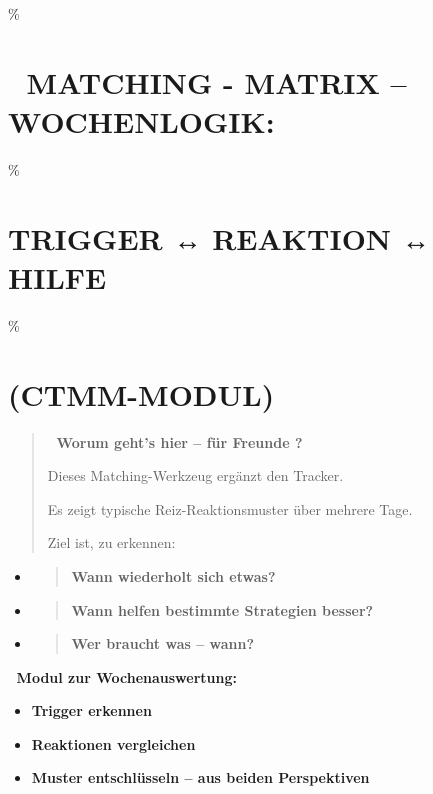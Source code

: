 \hypertarget{matching---matrix-wochenlogik}{\%
\section{\texorpdfstring{🧩 \textbf{MATCHING - MATRIX -- WOCHENLOGIK:}}{🧩 MATCHING - MATRIX -- WOCHENLOGIK:}}\label{matching---matrix-wochenlogik}}

\hypertarget{trigger-reaktion-hilfe}{\%
\section{\texorpdfstring{\textbf{TRIGGER ↔ REAKTION ↔ HILFE}}{TRIGGER ↔ REAKTION ↔ HILFE}}\label{trigger-reaktion-hilfe}}

\hypertarget{ctmm-modul}{\%
\section{\texorpdfstring{\textbf{(CTMM-MODUL)}}{(CTMM-MODUL)}}\label{ctmm-modul}}

\begin{quote}
🧠 \textbf{Worum geht's hier -- für Freunde ?}

Dieses Matching-Werkzeug ergänzt den Tracker.

Es zeigt typische Reiz-Reaktionsmuster über mehrere Tage.

Ziel ist, zu erkennen:
\end{quote}

\begin{itemize}
\item
  \begin{quote}
  \textbf{Wann wiederholt sich etwas?}
  \end{quote}
\item
  \begin{quote}
  \textbf{Wann helfen bestimmte Strategien besser?}
  \end{quote}
\item
  \begin{quote}
  \textbf{Wer braucht was -- wann?}
  \end{quote}
\end{itemize}

🧩 \textbf{Modul zur Wochenauswertung:}

\begin{itemize}
\item
  \textbf{Trigger erkennen}
\item
  \textbf{Reaktionen vergleichen}
\item
  \textbf{Muster entschlüsseln -- aus beiden Perspektiven}
\end{itemize}

